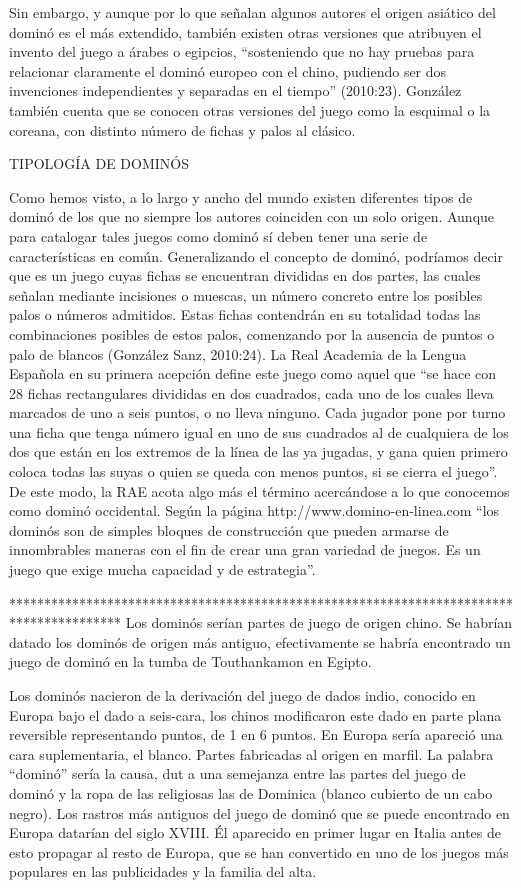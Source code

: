 Sin embargo, y aunque por lo que señalan algunos autores el origen asiático del dominó es el más extendido, también existen otras versiones que atribuyen el invento del juego a árabes o egipcios, “sosteniendo que no hay pruebas para relacionar claramente el dominó europeo con el chino, pudiendo ser dos invenciones independientes y separadas en el tiempo” (2010:23). González también cuenta que se conocen otras versiones del juego como la esquimal o la coreana, con distinto número de fichas y palos al clásico.
 
TIPOLOGÍA DE DOMINÓS

Como hemos visto, a lo largo y ancho del mundo existen diferentes tipos de dominó de los que no siempre los autores coinciden con un solo origen. Aunque para catalogar tales juegos como dominó sí deben tener una serie de características en común.
Generalizando el concepto de dominó, podríamos decir que es un juego cuyas fichas se encuentran divididas en dos partes, las cuales señalan mediante incisiones o muescas, un número concreto entre los posibles palos o números admitidos. Estas fichas contendrán en su totalidad todas las combinaciones posibles de estos palos, comenzando por la ausencia de puntos o palo de blancos (González Sanz, 2010:24).
La Real Academia de la Lengua Española en su primera acepción define este juego como aquel que “se hace con 28 fichas rectangulares divididas en dos cuadrados, cada uno de los cuales lleva marcados de uno a seis puntos, o no lleva ninguno. Cada jugador pone por turno una ficha que tenga número igual en uno de sus cuadrados al de cualquiera de los dos que están en los extremos de la línea de las ya jugadas, y gana quien primero coloca todas las suyas o quien se queda con menos puntos, si se cierra el juego”. De este modo, la RAE acota algo más el término acercándose a lo que conocemos como dominó occidental.
Según la página http://www.domino-en-linea.com “los dominós son de simples bloques de construcción que pueden armarse de innombrables maneras con el fin de crear una gran variedad de juegos. Es un juego que exige mucha capacidad y de estrategia”.

****************************************************************************************
Los dominós serían partes de juego de origen chino. 
Se habrían datado los dominós de origen más antiguo, efectivamente se habría encontrado un juego de dominó en la tumba de Touthankamon en Egipto.

Los dominós nacieron de la derivación del juego de dados indio, conocido en Europa bajo el dado a seis-cara, los chinos modificaron este dado en parte plana reversible representando puntos, de 1 en 6 puntos. En Europa sería apareció una cara suplementaria, el blanco.
Partes fabricadas al origen en marfil.
La palabra “dominó” sería la causa, dut a una semejanza entre las partes del juego de dominó y la ropa de las religiosas las de Dominica (blanco cubierto de un cabo negro).
Los rastros más antiguos del juego de dominó que se puede encontrado en Europa datarían del siglo XVIII. Él aparecido en primer lugar en Italia antes de esto propagar al resto de Europa, que se han convertido en uno de los juegos más populares en las publicidades y la familia del alta.



